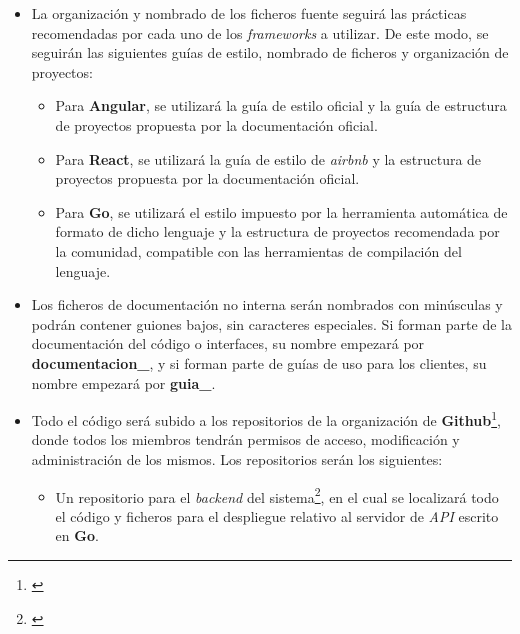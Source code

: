 \documentclass[11pt, a4paper, titlepage]{article}
\begin{document}
\begin{itemize}
    \item La organización y nombrado de los ficheros fuente seguirá las prácticas recomendadas por cada uno de los \textit{frameworks} a utilizar. De este modo, se seguirán las siguientes guías de estilo, nombrado de ficheros y organización de proyectos:
    \begin{itemize}
        \item Para \textbf{Angular}, se utilizará la guía de estilo oficial\cite{estiloangular} y la guía de estructura de proyectos propuesta por la documentación oficial\cite{estructuraangular}.
        
        \item Para \textbf{React}, se utilizará la
        guía de estilo de \textit{airbnb}\cite{estiloreact} y la estructura de proyectos propuesta por la documentación oficial\cite{estructurareact}.
        
        \item Para \textbf{Go}, se utilizará el estilo impuesto por la herramienta automática de formato de dicho lenguaje\cite{estilogolang} y la estructura de proyectos recomendada por la comunidad\cite{estructuragolang}, compatible con las herramientas de compilación del lenguaje.
    \end{itemize}
    
    \item Los ficheros de documentación no interna serán nombrados con minúsculas y podrán contener guiones bajos, sin caracteres especiales. Si forman parte de la documentación del código o interfaces, su nombre empezará por \textbf{documentacion\_}, y si forman parte de guías de uso para los clientes, su nombre empezará por \textbf{guia\_}.
    
    \item Todo el código será subido a los repositorios de la organización de \textbf{Github}\footnote{\href{https://github.com/UNIZAR-30226-2022-01}{}}, donde todos los miembros tendrán permisos de acceso, modificación y administración de los mismos. Los repositorios serán los siguientes:
    \begin{itemize}
        \item Un repositorio para el \textit{backend} del sistema\footnote{\href{https://github.com/UNIZAR-30226-2022-01/proyecto_software_backend}{}}, en el cual se localizará todo el código y ficheros para el despliegue relativo al servidor de \textit{API} escrito en \textbf{Go}.
        

\end{itemize}
\end{itemize}
\end{document}
